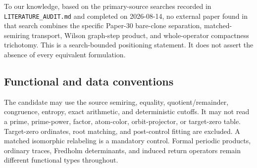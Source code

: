 To our knowledge, based on the primary-source searches recorded in
\texttt{LITERATURE\_AUDIT.md} and completed on 2026-08-14, no external paper
found in that search combines the specific Paper-30 bare-clone separation,
matched-semiring transport, Wilson graph-step product, and whole-operator
compactness trichotomy.  This is a search-bounded positioning statement.  It
does not assert the absence of every equivalent formulation.

\subsection{Functional and data conventions}

The candidate may use the source semiring, equality, quotient/remainder,
congruence, entropy, exact arithmetic, and deterministic cutoffs.  It may not
read a prime, prime-power, factor, atom-color, orbit-projector, or target-zero
table.  Target-zero ordinates, root matching, and post-control fitting are
excluded.  A matched isomorphic relabeling is a mandatory control.  Formal
periodic products, ordinary traces, Fredholm determinants, and induced return
operators remain different functional types throughout.
